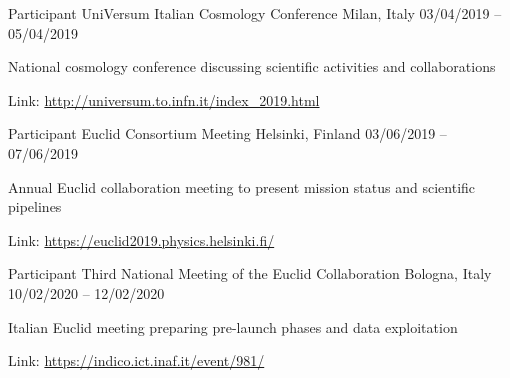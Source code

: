 


\begin{cventries}


\cventry
{Participant} %
{UniVersum Italian Cosmology Conference} %
{Milan, Italy} %
{03/04/2019 -- 05/04/2019} %
{ %
\begin{cvitems}
  \item {National cosmology conference discussing scientific activities and collaborations}
  \item {Link: \url{http://universum.to.infn.it/index_2019.html}}
\end{cvitems}
}


\cventry
{Participant} %
{Euclid Consortium Meeting} %
{Helsinki, Finland} %
{03/06/2019 -- 07/06/2019} %
{ %
\begin{cvitems}
  \item {Annual Euclid collaboration meeting to present mission status and scientific pipelines}
  \item {Link: \url{https://euclid2019.physics.helsinki.fi/}}
\end{cvitems}
}


\cventry
{Participant} %
{Third National Meeting of the Euclid Collaboration} %
{Bologna, Italy} %
{10/02/2020 -- 12/02/2020} %
{ %
\begin{cvitems}
  \item {Italian Euclid meeting preparing pre-launch phases and data exploitation}
  \item {Link: \url{https://indico.ict.inaf.it/event/981/}}
\end{cvitems}
}



\end{cventries}

